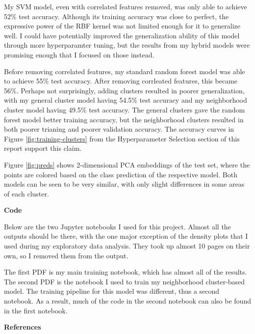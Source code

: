 \documentclass{ws-ijprai}
\newcommand{\subheader}[1]{\bigskip\begin{center}\textbf{#1}\end{center}}
\begin{document}
My SVM model, even with correlated features removed, was only able to achieve 52\% test accuracy. Although its training accuracy was close to perfect, the expressive power of the RBF kernel was not limited enough for it to generalize well. I could have potentially improved the generalization ability of this model through more hyperparamter tuning, but the results from my hybrid models were promising enough that I focused on those instead.

Before removing correlated features, my standard random forest model was able to achieve 55\% test accuracy. After removing corrleated features, this became 56\%. Perhaps not surprisingly, adding clusters resulted in poorer generalization, with my general cluster model having 54.5\% test accuracy and my neighborhood cluster model having 49.5\% test accuracy. The general clusters gave the random forest model better training accuracy, but the neighborhood clusters resulted in both poorer trianing and poorer validation accuracy. The accuracy curves in Figure \ref{fig:training-clusters} from the Hyperparameter Selection section of this report support this claim.

Figure \ref{fig:preds} shows 2-dimensional PCA embeddings of the test set, where the points are colored based on the class prediction of the respective model. Both models can be seen to be very similar, with only slight differences in some areas of each cluster.

\subheader{Code}

Below are the two Jupyter notebooks I used for this project. Almost all the outputs should be there, with the one major exception of the density plots that I used during my exploratory data analysis. They took up almost 10 pages on their own, so I removed them from the output.

The first PDF is my main training notebook, which has almost all of the results. The second PDF is the notebook I used to train my neighborhood cluster-based model. The training pipeline for this model was different, thus a second notebook. As a result, much of the code in the second notebook can also be found in the first notebook.






\subheader{References}



\end{document}
